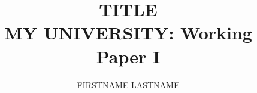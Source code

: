 \documentclass[a4paper]{article}
\begin{document}

\title{TITLE\\ \small{MY UNIVERSITY: Working Paper I}}
\author{FIRSTNAME LASTNAME}
\maketitle

\tableofcontents











\end{document}
